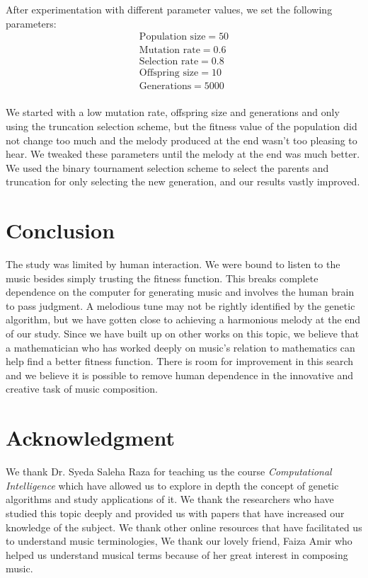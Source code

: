 \documentclass[conference]{IEEEtran}
\begin{document}
After experimentation with different parameter values, we set the following parameters:
\begin{align*}
\text{Population size}=50\\
\text{Mutation rate} = 0.6\\
\text{Selection rate} = 0.8\\
\text{Offspring size}= 10\\
\text{Generations}= 5000\\
\end{align*}

We started with a low mutation rate, offspring size and generations and only using the truncation selection scheme, but the fitness value of the population did not change too much and the melody produced at the end wasn't too pleasing to hear. We tweaked these parameters until the melody at the end was much better. We used the binary tournament selection scheme to select the parents and truncation for only selecting the new generation, and our results vastly improved.

\section{Conclusion}
The study was limited by human interaction. We were bound to listen to the music besides simply trusting the fitness function. This breaks complete dependence on the computer for generating music and involves the human brain to pass judgment. A melodious tune may not be rightly identified by the genetic algorithm, but we have gotten close to achieving a harmonious melody at the end of our study. Since we have built up on other works on this topic, we believe that a mathematician who has worked deeply on music's relation to mathematics can help find a better fitness function. There is room for improvement in this search and we believe it is possible to remove human dependence in the innovative and creative task of music composition.

\section*{Acknowledgment}
We thank Dr. Syeda Saleha Raza for teaching us the course \textit{Computational Intelligence} which have allowed us to explore in depth the concept of genetic algorithms and study applications of it. We thank the researchers who have studied this topic deeply and provided us with papers that have increased our knowledge of the subject. We thank other online resources that have facilitated us to understand music terminologies, We thank our lovely friend, Faiza Amir who helped us understand musical terms because of her great interest in composing music.
\end{document}
